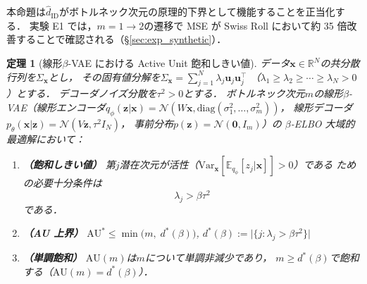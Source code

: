 \documentclass[11pt,a4paper]{jsarticle}
\newtheorem{theorem}{定理}
\newcommand{\R}{\mathbb{R}}
\begin{document}
本命題は$\hat{d}_\mathrm{ID}$がボトルネック次元の原理的下界として機能することを正当化する．
実験 E1 では，$m = 1 \to 2$の遷移で MSE が Swiss Roll において約 35 倍改善することで確認される（§\ref{sec:exp_synthetic}）．

\begin{theorem}[線形$\beta$-VAE における Active Unit 飽和しきい値]\label{thm:linear_vae}
データ$\boldsymbol{x} \in \R^N$の共分散行列を$\Sigma_{\boldsymbol{x}}$とし，
その固有値分解を$\Sigma_{\boldsymbol{x}} = \sum_{j=1}^{N} \lambda_j \boldsymbol{u}_j \boldsymbol{u}_j^\top$
（$\lambda_1 \geq \lambda_2 \geq \cdots \geq \lambda_N > 0$）とする．
デコーダノイズ分散を$\tau^2 > 0$とする．
ボトルネック次元$m$の線形$\beta$-VAE（線形エンコーダ$q_\phi(\boldsymbol{z}|\boldsymbol{x}) = \mathcal{N}(W\boldsymbol{x}, \mathrm{diag}(\sigma_1^2,\ldots,\sigma_m^2))$，
線形デコーダ$p_\theta(\boldsymbol{x}|\boldsymbol{z}) = \mathcal{N}(V\boldsymbol{z}, \tau^2 I_N)$，
事前分布$p(\boldsymbol{z}) = \mathcal{N}(\boldsymbol{0}, I_m)$）の
$\beta$-ELBO 大域的最適解において：

\begin{enumerate}
  \item \textbf{（飽和しきい値）} 第$j$潜在次元が活性（$\mathrm{Var}_{\boldsymbol{x}}[\mathbb{E}_{q_\phi}[z_j|\boldsymbol{x}]] > 0$）である
        ための必要十分条件は
        \begin{equation}
          \lambda_j > \beta \tau^2 \label{eq:au_threshold}
        \end{equation}
        である．
  \item \textbf{（AU 上界）}
        $\mathrm{AU}^* \leq \min\bigl(m,\; d^*(\beta)\bigr)$,\quad
        $d^*(\beta) := \bigl|\{j : \lambda_j > \beta\tau^2\}\bigr|$
  \item \textbf{（単調飽和）}
        $\mathrm{AU}(m)$は$m$について単調非減少であり，
        $m \geq d^*(\beta)$で飽和する（$\mathrm{AU}(m) = d^*(\beta)$）．
\end{enumerate}
\end{theorem}
\end{document}
